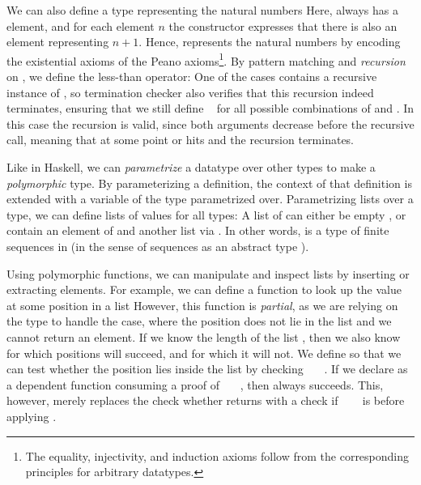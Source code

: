 We can also define a type representing the natural numbers
Here, \bN{} always has a  element, and for each element $n$ the constructor  expresses that there is also an element representing $n + 1$. Hence, \bN{} represents the natural numbers by encoding the existential axioms of the Peano axioms\footnote{The equality, injectivity, and induction axioms follow from the corresponding principles for arbitrary datatypes.}. By pattern matching and \emph{recursion} on \bN{}, we define the less-than operator:
One of the cases contains a recursive instance of \bN{}, so termination checker also verifies that this recursion indeed terminates, ensuring that we still define \   for all possible combinations of  and . In this case the recursion is valid, since both arguments decrease before the recursive call, meaning that at some point  or  hits  and the recursion terminates.

Like in Haskell, we can \emph{parametrize} a datatype over other types to make a \emph{polymorphic} type. By parameterizing a definition, the context of that definition is extended with a variable of the type parametrized over. Parametrizing lists over a type, we can define lists of values for all types:
A list of  can either be empty \AIC{[]}, or contain an element of  and another list via . In other words,  is a type of finite sequences in  (in the sense of sequences as an abstract type \cite{purelyfunctional}).

Using polymorphic functions, we can manipulate and inspect lists by inserting or extracting elements. For example, we can define a function to look up the value at some position  in a list
However, this function is \emph{partial}, as we are relying on the type
to handle the \AIC{[]} case, where the position does not lie in the list and we cannot return an element. If we know the length of the list , then we also know for which positions  will succeed, and for which it will not. We define 
so that we can test whether the position  lies inside the list by checking \ \ \ . If we declare  as a dependent function consuming a proof of \ \ \ , then  always succeeds. This, however, merely replaces the check whether  returns  with a check if \ \ \  is before applying .

